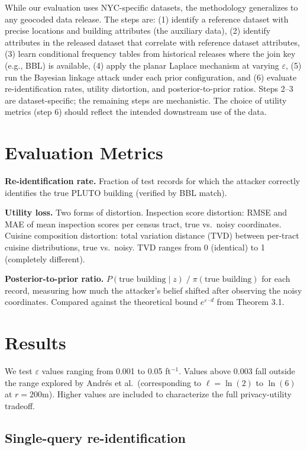 \documentclass[11pt]{article}
\begin{document}
While our evaluation uses NYC-specific datasets, the methodology generalizes to any geocoded data release. The steps are: (1) identify a reference dataset with precise locations and building attributes (the auxiliary data), (2) identify attributes in the released dataset that correlate with reference dataset attributes, (3) learn conditional frequency tables from historical releases where the join key (e.g., BBL) is available, (4) apply the planar Laplace mechanism at varying $\varepsilon$, (5) run the Bayesian linkage attack under each prior configuration, and (6) evaluate re-identification rates, utility distortion, and posterior-to-prior ratios. Steps 2--3 are dataset-specific; the remaining steps are mechanistic. The choice of utility metrics (step 6) should reflect the intended downstream use of the data.

\section{Evaluation Metrics}

\textbf{Re-identification rate.} Fraction of test records for which the attacker correctly identifies the true PLUTO building (verified by BBL match).

\textbf{Utility loss.} Two forms of distortion. Inspection score distortion: RMSE and MAE of mean inspection scores per census tract, true vs.\ noisy coordinates. Cuisine composition distortion: total variation distance (TVD) between per-tract cuisine distributions, true vs.\ noisy. TVD ranges from 0 (identical) to 1 (completely different).

\textbf{Posterior-to-prior ratio.} $P(\text{true building} \mid z) \;/\; \pi(\text{true building})$ for each record, measuring how much the attacker's belief shifted after observing the noisy coordinates. Compared against the theoretical bound $e^{\varepsilon \cdot d}$ from Theorem 3.1.

\section{Results}

We test $\varepsilon$ values ranging from 0.001 to 0.05 ft$^{-1}$. Values above 0.003 fall outside the range explored by Andr\'es et al.\ (corresponding to $\ell = \ln(2)$ to $\ln(6)$ at $r = 200$m). Higher values are included to characterize the full privacy-utility tradeoff.

\subsection{Single-query re-identification}
\end{document}
